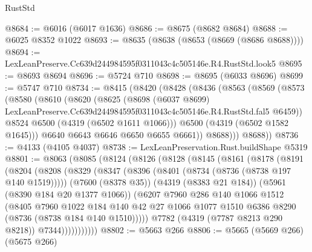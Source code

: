 \begin{lexlean}{RustStd}
\begin{coremodule}
@8684 := @6016 (@6017 @1636)
@8686 := @8675 (@8682 @8684)
@8688 := @6025 @8352 @1022
@8693 := @8635 (@8638 (@8653 (@8669 (@8686 @8688))))
@8694 := LexLeanPreserve.Cc639d244984595f0311043c4c505146e.R4.RustStd.look5
@8695 := @8693 @8694
@8696 := @5724 @710
@8698 := @8695 (@6033 @8696)
@8699 := @5747 @710
@8734 := @8415
    (@8420
      (@8428
        (@8436
          (@8563
            (@8569
              (@8573
                (@8580
                  (@8610
                    (@8620
                      (@8625
                        (@8698
                          (@6037 @8699)
                          LexLeanPreserve.Cc639d244984595f0311043c4c505146e.R4.RustStd.fal5
                          @6459))
                      @8524
                      @6500
                      (@4319 (@6502 @1611 @1066)))
                    @6500
                    (@4319 (@6502 @1582 @1645)))
                  @6640
                  @6643
                  @6646
                  @6650
                  @6655
                  @6661))
              @8688)))
        @8688))
@8736 := @4133 (@4105 @4037)
@8738 := LexLeanPreservation.Rust.buildShape @5319
@8801 := @8063
    (@8085
      (@8124
        (@8126
          (@8128
            (@8145
              (@8161
                (@8178
                  (@8191
                    (@8204
                      (@8208
                        (@8329
                          (@8347
                            (@8396 (@8401 (@8734 (@8736 (@8738 @197 @140 @1519)))))
                            (@7600 (@8378 @35))
                            (@4319 (@8383 @21 @184))
                            (@5961 (@8390 @184 @20 @1377 @1066))
                            (@6207
                              @7960
                              @286
                              @140
                              @1066
                              @1512
                              (@8405
                                @7960
                                @1022
                                @184
                                @140
                                @42
                                @27
                                @1066
                                @1077
                                @1510
                                @6386
                                @8290
                                (@8736 (@8738 @184 @140 @1510)))))
                          @7782
                          (@4319 (@7787 @8213 @290 @8218))
                          @7344)))))))))))
@8802 := @5663 @266
@8806 := @5665 (@5669 @266) (@5675 @266)

\end{coremodule}
\end{lexlean}
